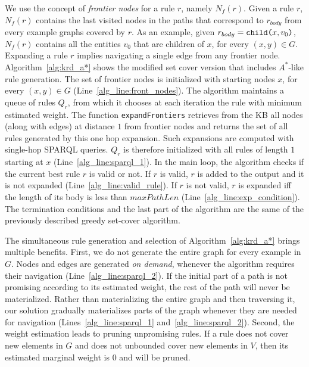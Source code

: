 We use the concept of \emph{frontier nodes} for a rule $r$, namely $N_f(r)$. Given a rule $r$, $N_f(r)$ contains the last visited nodes in the paths that correspond to $r_{body}$ from every example graphs covered by $r$. As an example, given $r_{body} = \texttt{child(}x,v_0\texttt{)}$, $N_f(r)$ contains all the entities $v_0$ that are children of $x$, for every $(x,y) \in G$. 
Expanding a rule $r$ implies navigating a single edge from any frontier node. Algorithm~\ref{alg:krd_a*} shows the modified set cover version that includes $A^*$-like rule generation. The set of frontier nodes is initialized with starting nodes $x$, for every $(x,y) \in G$ (Line~\ref{alg_line:front_nodes}). The algorithm maintains a queue of rules $Q_r$, from which it chooses at each iteration the rule with minimum estimated weight. 
The function \texttt{expandFrontiers} retrieves from the KB all nodes (along with edges) at distance $1$ from frontier nodes and returns the set of all rules generated by this one hop expansion. Such expansions are computed with single-hop SPARQL queries. $Q_r$ is therefore initialized with all rules of length $1$ starting at $x$ (Line~\ref{alg_line:sparql_1}). In the main loop, the algorithm checks if the current best rule $r$ is valid or not. If $r$ is valid, $r$ is added to the output and it is not expanded (Line~\ref{alg_line:valid_rule}). If $r$ is not valid, $r$ is expanded iff the length of its body is less than $maxPathLen$ (Line~\ref{alg_line:exp_condition}). 
The termination conditions and the last part of the algorithm are the same of the previously described greedy set-cover algorithm. %

The simultaneous rule generation and selection of Algorithm~\ref{alg:krd_a*} brings multiple benefits. First, we do not generate the entire graph for every example in $G$. Nodes and edges are generated \emph{on demand}, whenever the algorithm requires their navigation (Line~\ref{alg_line:sparql_2}). If the initial part of a path is not promising according to its estimated weight, the rest of the path will never be materialized. %
Rather than materializing the entire graph and then traversing it, our solution gradually materializes parts of the graph whenever they are needed for navigation (Lines~\ref{alg_line:sparql_1} and~\ref{alg_line:sparql_2}). 
Second, the weight estimation leads to pruning unpromising rules. If a rule does not cover new elements in $G$ and does not unbounded cover new elements in $V$, then its estimated marginal weight is $0$ and will be pruned. 

